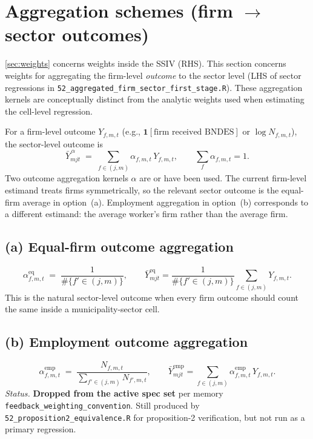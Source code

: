 \documentclass[12pt]{article}
\theoremstyle{definition}
\newcommand{\ind}{\mathbf{1}}
\begin{document}
\section{Aggregation schemes (firm $\to$ sector outcomes)}
\label{sec:aggregation}

\cref{sec:weights} concerns weights inside the SSIV (RHS). This section concerns weights for aggregating the firm-level \emph{outcome} to the sector level (LHS of sector regressions in \texttt{52\_aggregated\_firm\_sector\_first\_stage.R}). These aggregation kernels are conceptually distinct from the analytic weights used when estimating the cell-level regression.

For a firm-level outcome $Y_{f,m,t}$ (e.g., $\ind[\text{firm received BNDES}]$ or $\log N_{f,m,t}$), the sector-level outcome is
\begin{equation}
\bar Y^{\,\alpha}_{m j t} \;=\; \sum_{f \in (j,m)} \alpha_{f,m,t}\,Y_{f,m,t},\qquad \sum_f \alpha_{f,m,t} = 1.
\end{equation}
Two outcome aggregation kernels $\alpha$ are or have been used. The current firm-level estimand treats firms symmetrically, so the relevant sector outcome is the equal-firm average in option~(a). Employment aggregation in option~(b) corresponds to a different estimand: the average worker's firm rather than the average firm.

\subsection*{(a) Equal-firm outcome aggregation}
\[
  \alpha^{\text{eq}}_{f,m,t} \;=\; \frac{1}{\#\{f' \in (j,m)\}},
  \qquad
  \bar Y^{\text{eq}}_{m j t} = \frac{1}{\#\{f' \in (j,m)\}}\sum_{f \in (j,m)} Y_{f,m,t}.
\]
This is the natural sector-level outcome when every firm outcome should count the same inside a municipality-sector cell.

\subsection*{(b) Employment outcome aggregation}
\[
  \alpha^{\text{emp}}_{f,m,t} \;=\; \frac{N_{f,m,t}}{\sum_{f'\in(j,m)} N_{f',m,t}},
  \qquad
  \bar Y^{\text{emp}}_{m j t} = \sum_{f \in (j,m)} \alpha^{\text{emp}}_{f,m,t}\,Y_{f,m,t}.
\]
\textit{Status.} \textbf{Dropped from the active spec set} per memory \texttt{feedback\_weighting\_convention}. Still produced by \texttt{52\_proposition2\_equivalence.R} for proposition-2 verification, but not run as a primary regression.
\end{document}
